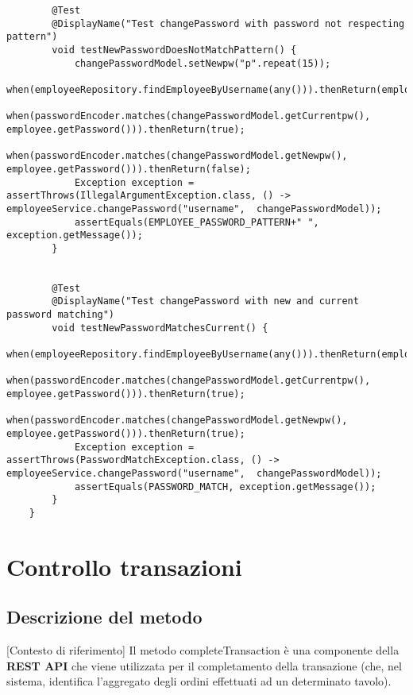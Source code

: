 \begin{verbatim}
		@Test
		@DisplayName("Test changePassword with password not respecting pattern")
		void testNewPasswordDoesNotMatchPattern() {
			changePasswordModel.setNewpw("p".repeat(15));
			when(employeeRepository.findEmployeeByUsername(any())).thenReturn(employee);
			when(passwordEncoder.matches(changePasswordModel.getCurrentpw(), employee.getPassword())).thenReturn(true);
			when(passwordEncoder.matches(changePasswordModel.getNewpw(), employee.getPassword())).thenReturn(false);
			Exception exception = assertThrows(IllegalArgumentException.class, () -> employeeService.changePassword("username",  changePasswordModel));
			assertEquals(EMPLOYEE_PASSWORD_PATTERN+" ", exception.getMessage());
		}


		@Test
		@DisplayName("Test changePassword with new and current password matching")
		void testNewPasswordMatchesCurrent() {
			when(employeeRepository.findEmployeeByUsername(any())).thenReturn(employee);
			when(passwordEncoder.matches(changePasswordModel.getCurrentpw(), employee.getPassword())).thenReturn(true);
			when(passwordEncoder.matches(changePasswordModel.getNewpw(), employee.getPassword())).thenReturn(true);
			Exception exception = assertThrows(PasswordMatchException.class, () -> employeeService.changePassword("username",  changePasswordModel));
			assertEquals(PASSWORD_MATCH, exception.getMessage());
		}
	}
\end{verbatim}

\section{Controllo transazioni}
\subsection{Descrizione del metodo}[Contesto di riferimento]
Il metodo completeTransaction è una componente della \textbf{REST API} che viene utilizzata
per il completamento della transazione (che, nel sistema, identifica l'aggregato degli ordini
effettuati ad un determinato tavolo).

